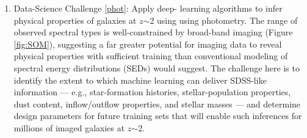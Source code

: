 

\begin{enumerate}[rightmargin=0.2cm,leftmargin=0.2cm]
%
%
\item[] {\textsf {\large Data-Science Challenge \ref{phot}: Apply deep-
learning algorithms to infer physical properties of galaxies at
$z$$\sim$2 using using photometry.}} The range of observed spectral
types is well-constrained by broad-band imaging (Figure \ref{fig:SOM}),
suggesting a far greater potential for imaging data to reveal physical
properties with sufficient training than conventional modeling of
spectral energy distributions (SEDs) would suggest.  The challenge here is to identify the extent to which machine
learning can deliver SDSS-like information --- e.g., star-formation histories,
stellar-population properties, dust content, inflow/outflow properties,
and stellar masses --- and determine design parameters for future training sets that will enable such inferences for millions of imaged galaxies at $z$$\sim$2.
%
\end{enumerate}


